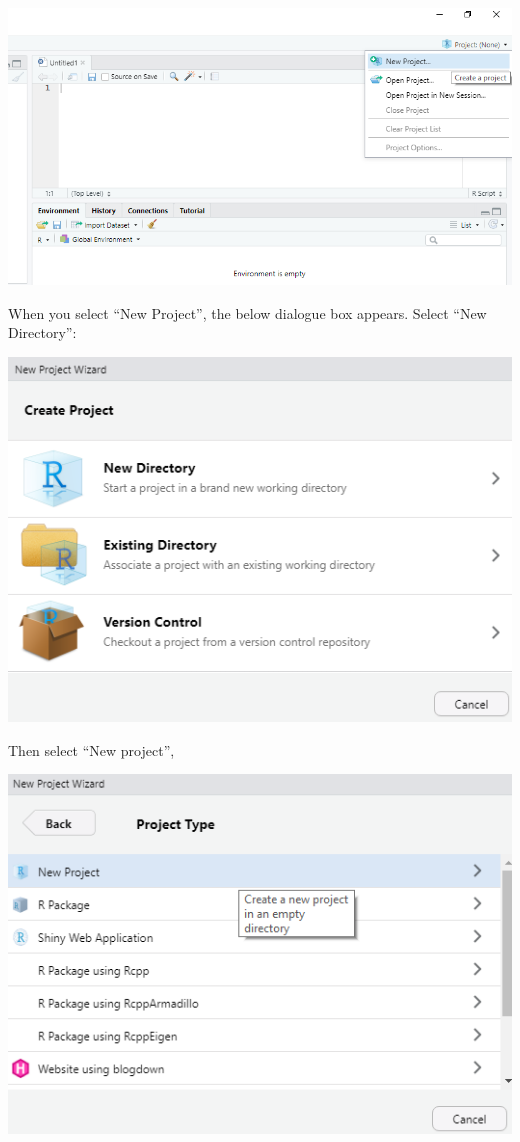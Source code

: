 \documentclass[
]{book}
\begin{document}
\includegraphics{images/projectmenu.png}

When you select ``New Project'', the below dialogue box appears. Select ``New Directory'':

\includegraphics{images/projoption1.png}

Then select ``New project'',

\includegraphics{images/projoption2.png}
\end{document}

